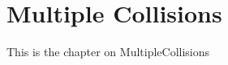 
\chapter{Multiple Collisions}
\label{ch:MultipleCollisions}
This is the chapter on MultipleCollisions

